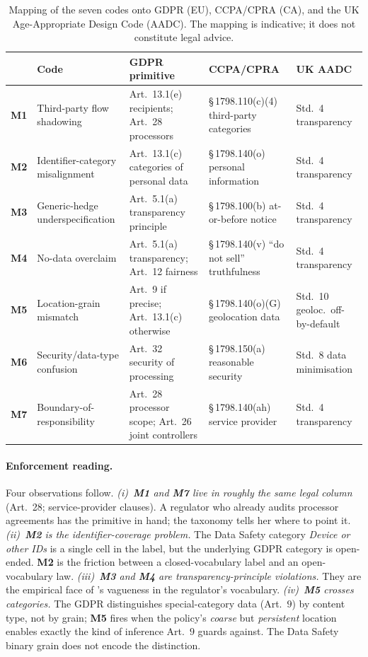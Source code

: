 \documentclass[11pt,a4paper]{article}
\newcommand{\code}[1]{\textsf{\textbf{#1}}}
\begin{document}
\begin{table}[t]
\centering\small
\caption{Mapping of the seven codes onto GDPR (EU), CCPA/CPRA (CA),
and the UK Age-Appropriate Design Code (AADC). The mapping is
indicative; it does not constitute legal advice.}
\label{tab:regmap}
\renewcommand{\arraystretch}{1.25}
\begin{tabular}{p{0.5cm}p{4.5cm}p{4.1cm}p{2.7cm}p{2.5cm}}
\toprule
& \textbf{Code} & \textbf{GDPR primitive} & \textbf{CCPA/CPRA} & \textbf{UK AADC} \\
\midrule
\code{M1} & Third-party flow shadowing &
Art.~13.1(e) recipients; Art.~28 processors &
\S\,1798.110(c)(4) third-party categories & Std.~4 transparency \\
\code{M2} & Identifier-category misalignment &
Art.~13.1(c) categories of personal data &
\S\,1798.140(o) personal information & Std.~4 transparency \\
\code{M3} & Generic-hedge underspecification &
Art.~5.1(a) transparency principle &
\S\,1798.100(b) at-or-before notice & Std.~4 transparency \\
\code{M4} & No-data overclaim &
Art.~5.1(a) transparency; Art.~12 fairness &
\S\,1798.140(v) ``do not sell'' truthfulness & Std.~4 transparency \\
\code{M5} & Location-grain mismatch &
Art.~9 if precise; Art.~13.1(c) otherwise &
\S\,1798.140(o)(G) geolocation data & Std.~10 geoloc.\ off-by-default \\
\code{M6} & Security/data-type confusion &
Art.~32 security of processing &
\S\,1798.150(a) reasonable security & Std.~8 data minimisation \\
\code{M7} & Boundary-of-responsibility &
Art.~28 processor scope; Art.~26 joint controllers &
\S\,1798.140(ah) service provider & Std.~4 transparency \\
\bottomrule
\end{tabular}
\end{table}

\paragraph{Enforcement reading.} Four observations follow.
\emph{(i)~\code{M1} and \code{M7} live in roughly the same legal
column} (Art.~28; service-provider clauses). A regulator who already
audits processor agreements has the primitive in hand; the taxonomy
tells her where to point it. \emph{(ii)~\code{M2} is the
identifier-coverage problem.} The Data Safety category
\textsl{Device or other IDs} is a single cell in the label, but the
underlying GDPR category is open-ended. \code{M2} is the friction
between a closed-vocabulary label and an open-vocabulary law.
\emph{(iii)~\code{M3} and \code{M4} are transparency-principle
violations.} They are the empirical face of
\citeauthor{bhatia2016theory}'s vagueness in the regulator's
vocabulary. \emph{(iv)~\code{M5} crosses categories.} The GDPR
distinguishes special-category data (Art.~$9$) by content type, not
by grain; \code{M5} fires when the policy's \emph{coarse} but
\emph{persistent} location enables exactly the kind of inference
Art.~$9$ guards against. The Data Safety binary grain does not encode
the distinction.
\end{document}
